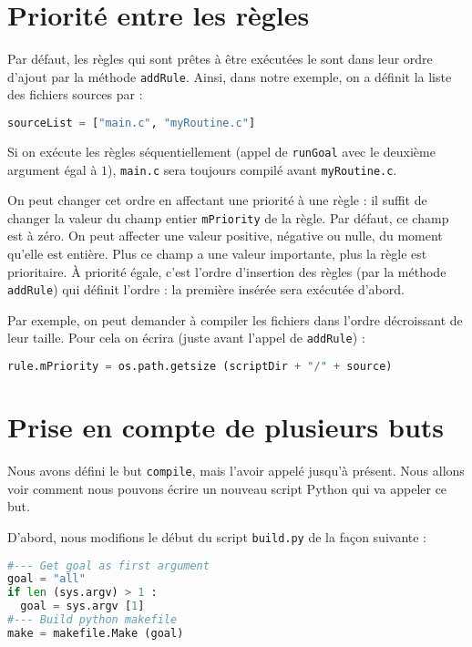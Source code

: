 \documentclass[a4paper,11pt]{extarticle}
\begin{document}
\section{Priorité entre les règles}

Par défaut, les règles qui sont prêtes à être exécutées le sont dans leur ordre d'ajout par la méthode \texttt{addRule}. Ainsi, dans notre exemple, on a définit la liste des fichiers sources par :
\begin{lstlisting}[language=py]
sourceList = ["main.c", "myRoutine.c"]
\end{lstlisting}
Si on exécute les règles séquentiellement (appel de \texttt{runGoal} avec le deuxième argument égal à $1$), \texttt{main.c} sera toujours compilé avant \texttt{myRoutine.c}.

On peut changer cet ordre en affectant une priorité à une règle : il suffit de changer la valeur du champ entier \texttt{mPriority} de la règle. Par défaut, ce champ est à zéro. On peut affecter une valeur positive, négative ou nulle, du moment qu'elle est entière. Plus ce champ a une valeur importante, plus la règle est prioritaire. À priorité égale, c'est l'ordre d'insertion des règles (par la méthode \texttt{addRule}) qui définit l'ordre : la première insérée sera exécutée d'abord.

Par exemple, on peut demander à compiler les fichiers dans l'ordre décroissant de leur taille. Pour cela on écrira (juste avant l'appel de \texttt{addRule}) :
\begin{lstlisting}[language=py]
  rule.mPriority = os.path.getsize (scriptDir + "/" + source)
\end{lstlisting}







\section{Prise en compte de plusieurs buts}

Nous avons défini le but \texttt{compile}, mais l'avoir appelé jusqu'à présent. Nous allons voir comment nous pouvons écrire un nouveau script Python qui va appeler ce but.

D'abord, nous modifions le début du script \texttt{build.py} de la façon suivante :
\begin{lstlisting}[language=py]
#--- Get goal as first argument
goal = "all"
if len (sys.argv) > 1 :
  goal = sys.argv [1]
#--- Build python makefile
make = makefile.Make (goal)
\end{lstlisting}
\end{document}
